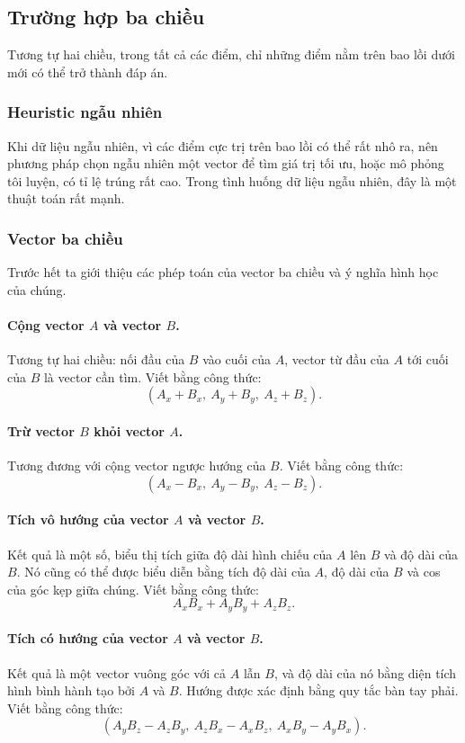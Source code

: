 \documentclass[11pt]{article}
\begin{document}
\subsection{Trường hợp ba chiều}

Tương tự hai chiều, trong tất cả các điểm, chỉ những điểm nằm trên bao lồi dưới
mới có thể trở thành đáp án.

\subsubsection{Heuristic ngẫu nhiên}

Khi dữ liệu ngẫu nhiên, vì các điểm cực trị trên bao lồi có thể rất nhô ra, nên
phương pháp chọn ngẫu nhiên một vector để tìm giá trị tối ưu, hoặc mô phỏng tôi
luyện, có tỉ lệ trúng rất cao. Trong tình huống dữ liệu ngẫu nhiên, đây là một
thuật toán rất mạnh.

\subsubsection{Vector ba chiều}

Trước hết ta giới thiệu các phép toán của vector ba chiều và ý nghĩa hình học
của chúng.

\paragraph{Cộng vector \(A\) và vector \(B\).}
Tương tự hai chiều: nối đầu của \(B\) vào cuối của \(A\), vector từ đầu của
\(A\) tới cuối của \(B\) là vector cần tìm. Viết bằng công thức:
\[
  (A_x+B_x,\ A_y+B_y,\ A_z+B_z).
\]

\paragraph{Trừ vector \(B\) khỏi vector \(A\).}
Tương đương với cộng vector ngược hướng của \(B\). Viết bằng công thức:
\[
  (A_x-B_x,\ A_y-B_y,\ A_z-B_z).
\]

\paragraph{Tích vô hướng của vector \(A\) và vector \(B\).}
Kết quả là một số, biểu thị tích giữa độ dài hình chiếu của \(A\) lên \(B\) và
độ dài của \(B\). Nó cũng có thể được biểu diễn bằng tích độ dài của \(A\), độ
dài của \(B\) và cos của góc kẹp giữa chúng. Viết bằng công thức:
\[
  A_xB_x+A_yB_y+A_zB_z.
\]

\paragraph{Tích có hướng của vector \(A\) và vector \(B\).}
Kết quả là một vector vuông góc với cả \(A\) lẫn \(B\), và độ dài của nó bằng
diện tích hình bình hành tạo bởi \(A\) và \(B\). Hướng được xác định bằng quy
tắc bàn tay phải. Viết bằng công thức:
\[
  (A_yB_z-A_zB_y,\ A_zB_x-A_xB_z,\ A_xB_y-A_yB_x).
\]
\end{document}
